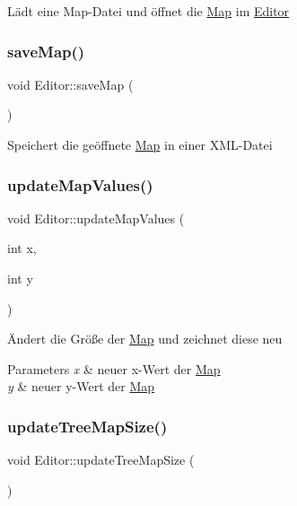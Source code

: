 Lädt eine Map-\/\+Datei und öffnet die \mbox{\hyperlink{class_map}{Map}} im \mbox{\hyperlink{class_editor}{Editor}} \mbox{\label{class_editor_add1f4b900d9c8ae6065ccd769929b617}} 
\subsubsection{\texorpdfstring{save\+Map()}{saveMap()}}
{\footnotesize\ttfamily void Editor\+::save\+Map (\begin{DoxyParamCaption}{ }\end{DoxyParamCaption})}

Speichert die geöffnete \mbox{\hyperlink{class_map}{Map}} in einer X\+M\+L-\/\+Datei \mbox{\label{class_editor_af487b4d79b6a61c4613ccf605328b708}} 
\subsubsection{\texorpdfstring{update\+Map\+Values()}{updateMapValues()}}
{\footnotesize\ttfamily void Editor\+::update\+Map\+Values (\begin{DoxyParamCaption}\item[{int}]{x,  }\item[{int}]{y }\end{DoxyParamCaption})}

Ändert die Größe der \mbox{\hyperlink{class_map}{Map}} und zeichnet diese neu 
\begin{DoxyParams}{Parameters}
{\em x} & neuer x-\/\+Wert der \mbox{\hyperlink{class_map}{Map}} \\
\hline
{\em y} & neuer y-\/\+Wert der \mbox{\hyperlink{class_map}{Map}} \\
\hline
\end{DoxyParams}
\mbox{\label{class_editor_af7eec42c19816c227c820871cf119dac}} 
\subsubsection{\texorpdfstring{update\+Tree\+Map\+Size()}{updateTreeMapSize()}}
{\footnotesize\ttfamily void Editor\+::update\+Tree\+Map\+Size (\begin{DoxyParamCaption}{ }\end{DoxyParamCaption})}

